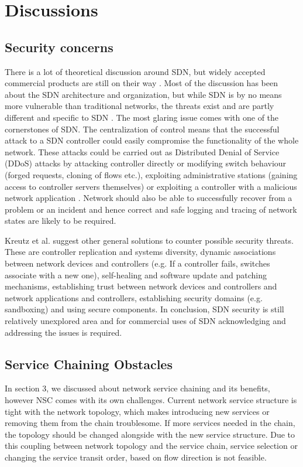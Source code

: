 \section{Discussions}

\subsection{Security concerns}

There is a lot of theoretical discussion around SDN, but widely accepted commercial products are still on their way \cite{Sorensen12}. Most of the discussion has been about the SDN architecture and organization, but while SDN is by no means more vulnerable than traditional networks, the threats exist and are partly different and specific to SDN \cite{Kreutz13}. The most glaring issue comes with one of the cornerstones of SDN. The centralization of control means that the successful attack to a SDN controller could easily compromise the functionality of the whole network. These attacks could be carried out as Distributed Denial of Service (DDoS) attacks by attacking controller directly or modifying switch behaviour (forged requests, cloning of flows etc.), exploiting administrative stations (gaining access to controller servers themselves) or exploiting a controller with a malicious network application  \cite{Kreutz13}. Network should also be able to successfully recover from a problem or an incident and hence correct and safe logging and tracing of network states are likely to be required.

Kreutz et al. suggest other general solutions to counter possible security threats. These are controller replication and systems diversity, dynamic associations between network devices and controllers (e.g. If a controller fails, switches associate with a new one), self-healing and software update and patching mechanisms, establishing trust between network devices and controllers and network applications and controllers, establishing security domains (e.g. sandboxing) and using secure components. In conclusion, SDN security is still relatively unexplored area and for commercial uses of SDN acknowledging and addressing the issues is required.

\subsection{Service Chaining Obstacles}

In section 3, we discussed about network service chaining and its benefits, however NSC comes with its own challenges. Current network service structure is tight with the network topology, which makes introducing new services or removing them from the chain troublesome. If more services needed in the chain, the topology should be changed alongside with the new service structure. Due to this coupling between network topology and the service chain, service selection or changing the service transit order, based on flow direction is not feasible. \cite{QN14}

